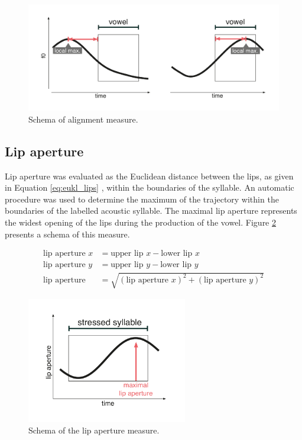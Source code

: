 \begin{figure}
\includegraphics[width=\textwidth]{figures/ch5/measures_alignment.pdf}
\caption{Schema of alignment measure.}
\label{fig:alignment_measure}
\end{figure}

\subsection{Lip aperture}

Lip aperture was evaluated as the Euclidean distance between the lips, as given in Equation \ref{eq:eukl_lips} \citep{Byrd2000}, within the boundaries of the syllable. An automatic procedure was used to determine the maximum of the trajectory within the boundaries of the labelled acoustic syllable. The maximal lip aperture represents the widest opening of the lips during the production of the vowel. Figure \ref{fig:lip_measure} presents a schema of this measure.

\begin{equation}
\begin{split}
\text{lip aperture } x &= \text{upper lip } x - \text{lower lip } x\\
\text{lip aperture } y &= \text{upper lip } y - \text{lower lip } y\\
\text{lip aperture} &= \sqrt{(\text{lip aperture } x)^2+(\text{lip aperture } y)^2}
\end{split}
\label{eq:eukl_lips}
\end{equation}

\begin{figure}
\includegraphics[width=7cm]{figures/ch5/measures_lips.pdf}
\caption{Schema of the lip aperture measure.}
\label{fig:lip_measure}
\end{figure}

